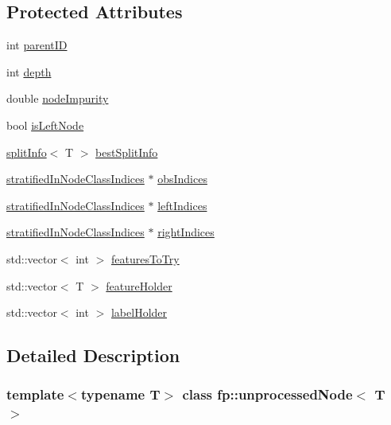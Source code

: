 \subsection*{Protected Attributes}
\begin{DoxyCompactItemize}
\item 
int \hyperlink{classfp_1_1unprocessedNode_a74cb75f76c24622444e531a583b75c3d}{parent\+ID}
\item 
int \hyperlink{classfp_1_1unprocessedNode_a22ebfbc35a57e2d30b81220c94f4d0d3}{depth}
\item 
double \hyperlink{classfp_1_1unprocessedNode_a5bb6906b09625f7893bf0ffd512b1714}{node\+Impurity}
\item 
bool \hyperlink{classfp_1_1unprocessedNode_a81b74c36ed1ac15d367e135e2fa0ba3d}{is\+Left\+Node}
\item 
\hyperlink{classfp_1_1splitInfo}{split\+Info}$<$ T $>$ \hyperlink{classfp_1_1unprocessedNode_a9146bd750d1f533e712634873551d060}{best\+Split\+Info}
\item 
\hyperlink{classfp_1_1stratifiedInNodeClassIndices}{stratified\+In\+Node\+Class\+Indices} $\ast$ \hyperlink{classfp_1_1unprocessedNode_aea171244695a3a099061188a9553e525}{obs\+Indices}
\item 
\hyperlink{classfp_1_1stratifiedInNodeClassIndices}{stratified\+In\+Node\+Class\+Indices} $\ast$ \hyperlink{classfp_1_1unprocessedNode_a0a147fea04670ff34ef0891a14ec67a3}{left\+Indices}
\item 
\hyperlink{classfp_1_1stratifiedInNodeClassIndices}{stratified\+In\+Node\+Class\+Indices} $\ast$ \hyperlink{classfp_1_1unprocessedNode_a4e805660b305b1056cea187ed5584a1d}{right\+Indices}
\item 
std\+::vector$<$ int $>$ \hyperlink{classfp_1_1unprocessedNode_a3cffd07402568c03834d0a1248f3a6e3}{features\+To\+Try}
\item 
std\+::vector$<$ T $>$ \hyperlink{classfp_1_1unprocessedNode_adbc4f28ec96b3ac3690cd28e71274bc5}{feature\+Holder}
\item 
std\+::vector$<$ int $>$ \hyperlink{classfp_1_1unprocessedNode_a99524f9266d6fcf979f15ef445e629ca}{label\+Holder}
\end{DoxyCompactItemize}


\subsection{Detailed Description}
\subsubsection*{template$<$typename T$>$\newline
class fp\+::unprocessed\+Node$<$ T $>$}



